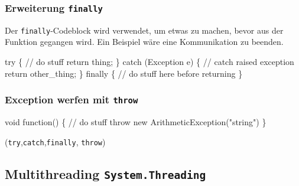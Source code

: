 \documentclass[
  9pt,
  a4paperpaper,
  DIV=11]{scrartcl}
\newenvironment{Shaded}{}{}
\newcommand{\CommentTok}[1]{\textcolor[rgb]{0.42,0.45,0.49}{#1}}
\newcommand{\DataTypeTok}[1]{\textcolor[rgb]{0.84,0.23,0.29}{#1}}
\newcommand{\FunctionTok}[1]{\textcolor[rgb]{0.44,0.26,0.76}{#1}}
\newcommand{\KeywordTok}[1]{\textcolor[rgb]{0.84,0.23,0.29}{#1}}
\newcommand{\NormalTok}[1]{\textcolor[rgb]{0.14,0.16,0.18}{#1}}
\newcommand{\OperatorTok}[1]{\textcolor[rgb]{0.14,0.16,0.18}{#1}}
\newcommand{\StringTok}[1]{\textcolor[rgb]{0.01,0.18,0.38}{#1}}
\numberwithin{equation}{section}
\begin{document}
\begin{multicols}{2}
{\subsubsection{\texorpdfstring{Erweiterung
\texttt{finally}}{Erweiterung finally}}\label{erweiterung-finally}}

Der \texttt{finally}-Codeblock wird verwendet, um etwas zu machen, bevor
aus der Funktion gegangen wird. Ein Beispiel wäre eine Kommunikation zu
beenden.

\begin{Shaded}
\begin{Highlighting}[]
\KeywordTok{try} \OperatorTok{\{}
  \CommentTok{// do stuff}
  \KeywordTok{return}\NormalTok{ thing}\OperatorTok{;}
\OperatorTok{\}}
\KeywordTok{catch} \OperatorTok{(}\NormalTok{Exception e}\OperatorTok{)} \OperatorTok{\{}
  \CommentTok{// catch raised exception}
  \KeywordTok{return}\NormalTok{ other\_thing}\OperatorTok{;}
\OperatorTok{\}}
\KeywordTok{finally} \OperatorTok{\{}
  \CommentTok{// do stuff here before returning}
\OperatorTok{\}}
\end{Highlighting}
\end{Shaded}

\hypertarget{exception-werfen-mit-throw}{%
\subsubsection{\texorpdfstring{Exception werfen mit
\texttt{throw}}{Exception werfen mit throw}}\label{exception-werfen-mit-throw}}

\begin{Shaded}
\begin{Highlighting}[]

\DataTypeTok{void} \FunctionTok{function}\OperatorTok{()} \OperatorTok{\{}
  \CommentTok{// do stuff}
  \KeywordTok{throw} \KeywordTok{new} \FunctionTok{ArithmeticException}\OperatorTok{(}\StringTok{"string"}\OperatorTok{)}
\OperatorTok{\}}
\end{Highlighting}
\end{Shaded}

(\texttt{try},\texttt{catch},\texttt{finally}, \texttt{throw})

\hypertarget{multithreading-system.threading}{%
\subsection{\texorpdfstring{Multithreading
\texttt{System.Threading}}{Multithreading System.Threading}}\label{multithreading-system.threading}}


\end{multicols}
\end{document}
